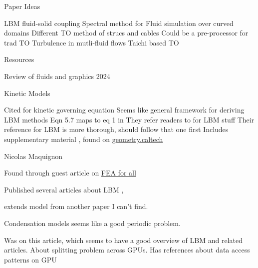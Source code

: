 \begin{frame}{Paper Ideas}
\begin{outline}
\1 LBM fluid-solid coupling \cite{Lyu2021}
\1 Spectral method for Fluid simulation over curved domains \cite{Cui2021}
\1 Different TO method of strucs and cables \cite{Rowe2023}
  \2 Could be a pre-processor for trad TO
\1 Turbulence in mutli-fluid flows \cite{Li2024}
\1 Taichi based TO \cite{Liu2018}
\end{outline}
\end{frame}

\begin{frame}{Resources}
  \begin{outline}
  \1 Review of fluids and graphics 2024 \cite{Wang2024}
  \end{outline}
\end{frame}

\begin{frame}{Kinetic Models}
  \begin{outline}
\1 Cited for kinetic governing equation \cite{Shan2006}
  \2 Seems like general framework for deriving LBM methods
  \2 Eqn 5.7 maps to eq 1 in \cite{Lyu2021}
\1 They refer readers to \cite{Li2020} for LBM stuff
  \2 Their reference for LBM is more thorough, should follow that one first
  \2 Includes supplementary material \cite{Li2020Supplement}, found on \href{http://www.geometry.caltech.edu/pubs.html}{geometry.caltech}
  \end{outline}
\end{frame}

\begin{frame}{Nicolas Maquignon}
  \begin{outline}
    \1 Found through guest article on 
    \href{https://feaforall.com/implementation-lattice-boltzmann-method-lbm/}{FEA for all}

    \1 Published several articles about LBM \cite{Maquignon2014}, \cite{Maquignon2022}

    \2 \cite{Maquignon2014} extends model from another paper I can't find.
      
    \2 Condensation models seems like a good periodic problem.

    \1 Was on this article, which seems to have a good overview of LBM and related articles. 
    About splitting problem across GPUs.
    Has references about data access patterns on GPU
    \cite{Duchateau2015}
  \end{outline}
\end{frame}

